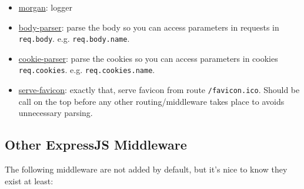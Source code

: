 \documentclass[12pt]{article}
\begin{document}
\begin{itemize}
\item
  \href{https://github.com/expressjs/morgan}{morgan}: logger
\item
  \href{https://github.com/expressjs/body-parser}{body-parser}: parse
  the body so you can access parameters in requests in
  \texttt{req.body}. e.g. \texttt{req.body.name}.
\item
  \href{https://github.com/expressjs/cookie-parser}{cookie-parser}:
  parse the cookies so you can access parameters in cookies
  \texttt{req.cookies}. e.g. \texttt{req.cookies.name}.
\item
  \href{https://github.com/expressjs/serve-favicon}{serve-favicon}:
  exactly that, serve favicon from route \texttt{/favicon.ico}. Should
  be call on the top before any other routing/middleware takes place to
  avoids unnecessary parsing.
\end{itemize}

\subsection{Other ExpressJS Middleware}

The following middleware are not added by default, but it's nice to
know they exist at least:
\end{document}
